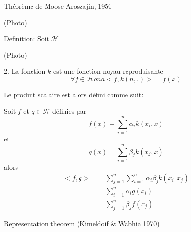 \documentclass{article}
\begin{document}
Th\'eor\`eme de Moose-Aroszajin, 1950

(Photo)

Definition: Soit $\mathcal{H}$

(Photo)

2. La fonction $k$ est une fonction noyau reproduisante 
\begin{equation}
\forall f\in \mathcal{H} on a <f,k(n,.)>=f(x)
\end{equation}

Le produit scalaire est alors d\'efini comme suit:

Soit $f$ et $g\in\mathcal{H}$ d\'efinies par
\begin{equation}
f(x)=\sum_{i=1}^n\alpha_ik(x_i,x)
\end{equation}
et
\begin{equation}
g(x)=\sum_{i=1}^n\beta_jk(x_j,x)
\end{equation}
alors
\begin{equation}
\begin{split}
<f,g>=&\sum_{j=1}^n\sum_{i=1}^n\alpha_i\beta_jk(x_i,x_j)\\
=&\sum_{i=1}^n\alpha_ig(x_i)\\
=&\sum_{j=1}^n\beta_jf(x_j)
\end{split}
\end{equation}

Representation theorem (Kimeldoif & Wabhia 1970)
\end{document}
